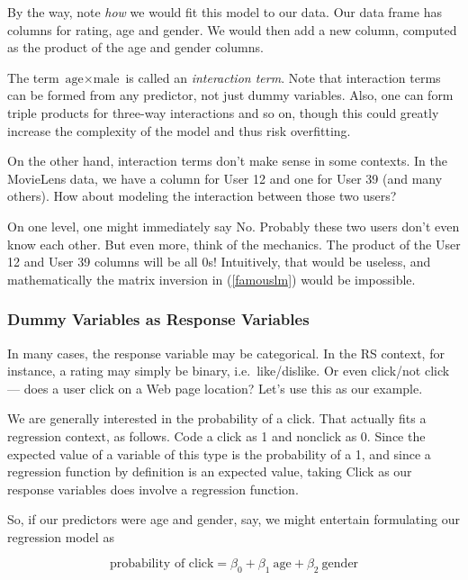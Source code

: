 By the way, note \textit{how} we would fit this model to our data.  Our
data frame has columns for rating, age and gender.  We would then add a
new column, computed as the product of the age and gender columns.

The term $\textrm{age} \times \textrm{male}$ is called an
\textit{interaction term}.  Note that interaction terms can be formed
from any predictor, not just dummy variables.  Also, one can form triple
products for three-way interactions and so on, though this could greatly
increase the complexity of the model and thus risk overfitting.

On the other hand, interaction terms don't make sense in some contexts.
In the MovieLens data, we have a column for User 12 and one for User 39
(and many others).  How about modeling the interaction between those two
users?

On one level, one might immediately say No.  Probably these two users
don't even know each other.  But even more, think of the mechanics.  The
product of the User 12 and User 39 columns will be all 0s!  Intuitively,
that would be useless, and mathematically the matrix inversion in
(\ref{famouslm}) would be impossible.


\subsubsection{Dummy Variables as Response Variables}

In many cases, the response variable may be categorical.  In the RS
context, for instance, a rating may simply be binary, i.e.\
like/dislike.  Or even click/not click --- does a user click on a Web page
location?  Let's use this as our example.

We are generally interested in the probability of a click.  That
actually fits a regression context, as follows.  Code a click as 1 and
nonclick as 0.  Since the expected value of a variable of this type is
the probability of a 1, and since a regression function by definition
is an expected value, taking Click as our response variables does
involve a regression function.

So, if our predictors were age and gender, say, we might entertain
formulating our regression model as

\begin{equation}
\label{clickagegen}
\textrm{probability of click} = \beta_0 + \beta_1 ~ \textrm{age} +
\beta_2 ~ \textrm{gender}
\end{equation}

